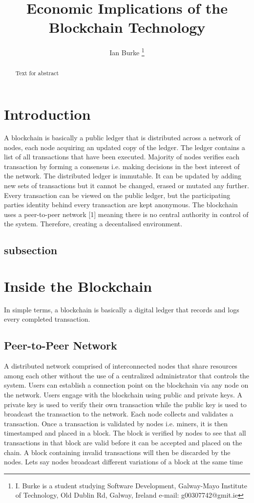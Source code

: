 \documentclass[report]{IEEEtran}
\begin{document}
\title{Economic Implications of the Blockchain Technology}
\author{Ian Burke %
\thanks{I. Burke is a student studying
Software Development, Galway-Mayo Institute of Technology, Old Dublin Rd, Galway, Ireland e-mail: g00307742@gmit.ie}%
}

\maketitle

\begin{abstract}
Text for abstract
\end{abstract}


\section{Introduction}
A blockchain is basically a public ledger that is distributed across a network of nodes, each node acquiring an updated copy of the ledger. The ledger contains a list of all transactions that have been executed. Majority of nodes verifies each transaction by forming a consensus i.e. making decisions in the best interest of the network. The distributed ledger is immutable. It can be updated by adding new sets of transactions but it cannot be changed, erased or mutated any further. Every transaction can be viewed on the public ledger, but the participating parties identity behind every transaction are kept anonymous. The blockchain uses a peer-to-peer network [1] meaning there is no central authority in control of the system. Therefore, creating a decentalised environment. 
\subsection{subsection}

\section{Inside the Blockchain}
In simple terms, a blockchain is basically a digital ledger that records and logs every completed transaction. 
\subsection{Peer-to-Peer Network}
A distributed network comprised of interconnected nodes that share resources among each other without the use of a centralized administrator that controls the system. Users can establish a connection point on the blockchain via any node on the network. Users engage with the blockchain using public and private keys. A private key is used to verify their own transaction while the public key is used to broadcast the transaction to the network. Each node collects and validates a transaction. Once a transaction is validated by nodes i.e. miners, it is then timestamped and placed in a block. The block is verified by nodes to see that all transactions in that block are valid before it can be accepted and placed on the chain. A block containing invalid transactions will then be discarded by the nodes. Lets say nodes broadcast different variations of a block at the same time
\end{document}
